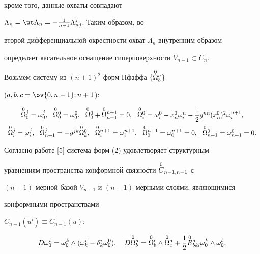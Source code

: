 кроме того, данные охваты совпадают 


$\Lambda_n=\wt\Lambda_n=-\frac{1}{n-1}\Lambda^j_{nj}$. Таким образом, во 


второй дифференциальной окрестности охват $\Lambda_n$ внутренним образом  


определяет касательное оснащение гиперповерхности $V_{n-1}\subset C_n$. 


 


Возьмем систему из $(n+1)^2$ форм Пфаффа $\{\overset{0}{\Omega}{}^a_b\}$ 


($a,b,c=\ov{0,n-1};n+1$): 


\begin{equation} 


\begin{array}{c} 


\up{0}{\Omega}^j_0=\omega^j_0,\ \ \up{0}{\Omega}^0_0= 


\omega^0_0,\ \ \up{0}{\Omega}^0_0+\up{0}{\Omega}^{n+1}_{n+1}=0, 


\ \ \up{0}{\Omega}^0_i=\omega^0_i-x^0_n\omega^n_i- 


\dfrac{1}{2}g^{nn}(x^0_n)^2\omega^{n+1}_i,\\[3mm] 


\up{0}{\Omega}^j_i=\omega^j_i,\ \  


\up{0}{\Omega}^j_{n+1}=-g^{jk}\up{0}{\Omega}^0_k,\ \  


\up{0}{\Omega}^{n+1}_i=\omega^{n+1}_i,\ \  


\up{0}{\Omega}^{n+1}_0=\omega^{n+1}_0=0,\ \  


\up{0}{\Omega}^0_{n+1}=\omega^0_{n+1}=0. 


\end{array} 


\end{equation} 


Согласно работе [5] система форм (2) удовлетворяет структурным 


уравнениям пространства конформной связности $\overset{0}{C}{}_{n-1,n-1}$ с 


$(n-1)$-мерной базой $V_{n-1}$ и $(n-1)$-мерными слоями, являющимися 


конформными пространствами 


$C_{n-1}(u^i)\equiv C_{n-1}(u)$: 


\begin{equation} 


D\omega^i_0=\omega^k_0\wedge(\omega^i_k- 


\delta^i_k\omega^0_0),\quad D\up{0}{\Omega}^a_b= 


\up{0}{\Omega}^c_b\wedge\up{0}{\Omega}^a_c+ 


\frac{1}{2}\up{0}{R}^a_{bkl}\omega^k_0\wedge\omega^l_0, 


\end{equation} 


